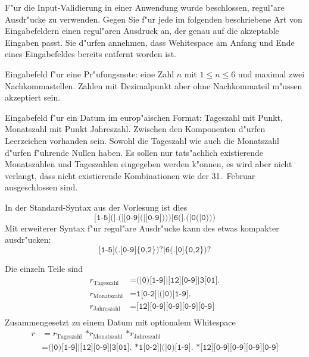 F"ur die Input-Validierung in einer Anwendung wurde beschlossen, regul"are
Ausdr"ucke zu verwenden.
Gegen Sie f"ur jede im folgenden beschriebene Art von Eingabefeldern einen
regul"aren Ausdruck an, der genau auf die akzeptable Eingaben passt.
Sie d"urfen annehmen, dass Wehitespace am Anfang und Ende eines Eingabefeldes
bereits entfernt worden ist.
\begin{teilaufgaben}
\item
Eingabefeld f"ur eine Pr"ufungsnote: eine Zahl $n$ mit $1\le n\le 6$
und maximal zwei Nachkommastellen.
Zahlen mit Dezimalpunkt aber ohne Nachkommateil m"ussen akzeptiert sein.
\item
Eingabefeld f"ur ein Datum im europ"aischen Format: Tageszahl mit Punkt,
Monatszahl mit Punkt Jahreszahl. Zwischen den Komponenten d"urfen Leerzeichen
vorhanden sein.
Sowohl die Tageszahl wie auch die Monatszahl d"urfen f"uhrende Nullen haben.
Es sollen nur tats"achlich existierende Monatszahlen
und Tageszahlen eingegeben werden k"onnen, es wird aber nicht verlangt,
dass nicht existierende Kombinationen wie der 31.~Februar ausgeschlossen
sind.
\end{teilaufgaben}

\begin{loesung}
\begin{teilaufgaben}
\item In der Standard-Syntax aus der Vorlesung ist dies
\[
\texttt{[1-5](|.(|[0-9](|[0-9])))|6(|.(|0(|0)))}
\]
Mit erweiterer Syntax f"ur regul"are Ausdr"ucke kann des etwas kompakter
ausdr"ucken:
\[
\texttt{[1-5](.[0-9]\{0,2\})?|6(.[0]\{0,2\})?}
\]
\item Die einzeln Teile sind
\begin{align*}
r_{\text{Tageszahl}}
&=
\texttt{(|0)[1-9]|[12][0-9]|3[01].}
\\
r_{\text{Monatszahl}}
&=
\texttt{1[0-2]|(|0)[1-9].}
\\
r_{\text{Jahreszahl}}
&=
\texttt{[12][0-9][0-9][0-9][0-9]}
\\
\end{align*}
Zusammengesetzt zu einem Datum mit optionalem Whitespace
\begin{align*}
r
&=
r_{\text{Tageszahl}}
\texttt{ *}
r_{\text{Monatszahl}}
\texttt{ *}
r_{\text{Jahreszahl}}
\\
&=
\texttt{(|0)[1-9]|[12][0-9]|3[01].}
\texttt{ *}
\texttt{1[0-2]|(|0)[1-9].}
\texttt{ *}
\texttt{[12][0-9][0-9][0-9][0-9]}
\end{align*}
\end{teilaufgaben}
\end{loesung}

\begin{bewertung}
\end{bewertung}

